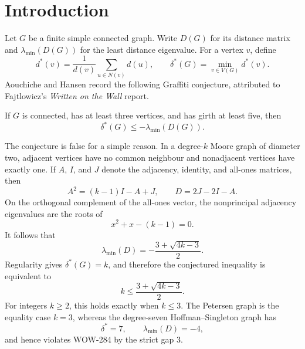 
\begin{abstract}
WOW-284 predicts that the minimum dual degree of every connected graph of order
at least three and girth at least five is at most the negative of its least
distance eigenvalue.  The degree-seven Hoffman--Singleton graph disproves the
conjecture.  More generally, a degree-$k$ Moore graph of diameter two satisfies
\[
  \delta^*(G)=k,
  \qquad
  \lambda_{\min}(D(G))=-\frac{3+\sqrt{4k-3}}2,
\]
so WOW-284 holds exactly for $k\le3$, with equality at $k=3$, and fails for every
realisable $k>3$.  We give a self-contained coordinate certificate for the
Hoffman--Singleton example and exact induced counterexamples of orders
$38,39,40$, and $42$.  For every connected $k$-regular graph of girth at least
five and diameter three we also prove
\[
  D=3J+(k-3)I-2A-A^2,
\]
which converts WOW-284 into an exact shifted adjacency-spectrum condition.  All
finite spectral decisions use exact arithmetic.  Lean~4.31 kernel-checks the
complete $50$-vertex proof and finite spectral certificates for the four smaller
constructions.
\end{abstract}

\section*{Introduction}

Let $G$ be a finite simple connected graph.  Write $D(G)$ for its distance
matrix and $\lambda_{\min}(D(G))$ for the least distance eigenvalue.  For a
vertex $v$, define
\[
  d^*(v)=\frac1{d(v)}\sum_{u\in N(v)}d(u),
  \qquad
  \delta^*(G)=\min_{v\in V(G)}d^*(v).
\]
Aouchiche and Hansen record the following Graffiti conjecture, attributed to
Fajtlowicz's \emph{Written on the Wall} report.

\begin{conjecture}[WOW-284]\label{conj:wow284-reader-first}
If $G$ is connected, has at least three vertices, and has girth at least five,
then
\[
  \delta^*(G)\le-\lambda_{\min}(D(G)).
\]
\end{conjecture}

The conjecture is false for a simple reason.  In a degree-$k$ Moore graph of
diameter two, adjacent vertices have no common neighbour and nonadjacent
vertices have exactly one.  If $A$, $I$, and $J$ denote the adjacency, identity,
and all-ones matrices, then
\[
  A^2=(k-1)I-A+J,
  \qquad
  D=2J-2I-A.
\]
On the orthogonal complement of the all-ones vector, the nonprincipal adjacency
eigenvalues are the roots of
\[
  x^2+x-(k-1)=0.
\]
It follows that
\[
  \lambda_{\min}(D)=-\frac{3+\sqrt{4k-3}}2.
\]
Regularity gives $\delta^*(G)=k$, and therefore the conjectured inequality is
equivalent to
\[
  k\le\frac{3+\sqrt{4k-3}}2.
\]
For integers $k\ge2$, this holds exactly when $k\le3$.  The Petersen graph is
the equality case $k=3$, whereas the degree-seven Hoffman--Singleton graph has
\[
  \delta^*=7,
  \qquad
  \lambda_{\min}(D)=-4,
\]
and hence violates WOW-284 by the strict gap $3$.

